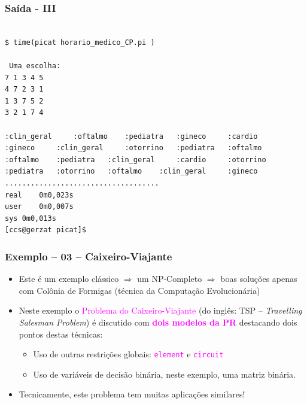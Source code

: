 \begin{frame}[fragile]

\frametitle{Saída - III}

\begin{footnotesize}
\begin{verbatim}

$ time(picat horario_medico_CP.pi )

 Uma escolha:
7 1 3 4 5 
4 7 2 3 1 
1 3 7 5 2 
3 2 1 7 4 

:clin_geral 	:oftalmo 	:pediatra 	:gineco 	:cardio 	
:gineco 	:clin_geral 	:otorrino 	:pediatra 	:oftalmo 	
:oftalmo 	:pediatra 	:clin_geral 	:cardio 	:otorrino 	
:pediatra 	:otorrino 	:oftalmo 	:clin_geral 	:gineco 	
....................................
real	0m0,023s
user	0m0,007s
sys	0m0,013s
[ccs@gerzat picat]$ 
\end{verbatim}
  
\end{footnotesize}
\end{frame}
\begin{frame}[fragile] 

\label{3o_exemplo}
\frametitle{Exemplo -- 03 -- Caixeiro-Viajante}

\begin{itemize}
\item Este é um exemplo clássico $\Rightarrow $ um NP-Completo $\Rightarrow $ boas soluções
apenas com Colônia de Formigas (técnica da Computação Evolucionária)

\pause
\item Neste exemplo o \textcolor{magenta}{Problema do Caixeiro-Viajante}
 (do inglês: TSP -- \textit{Travelling Salesman Problem}) é discutido com \textcolor{magenta}{\textbf{dois modelos da PR}} 
 destacando dois pontos destas técnicas:

\begin{itemize}
  \item  Uso de outras restrições globais: \textcolor{magenta}{\texttt{element}} e \textcolor{magenta}{\texttt{circuit}}
  \item  Uso de variáveis de decisão binária, neste exemplo, uma matriz binária. 
\end{itemize}

\pause
\item Tecnicamente, este problema tem muitas aplicações similares! 
\end{itemize}

\end{frame}

